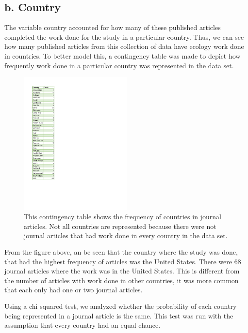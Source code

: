 \documentclass[
]{article}
\begin{document}
\hypertarget{b.-country}{%
\subsection{b. Country}\label{b.-country}}

The variable country accounted for how many of these published articles
completed the work done for the study in a particular country. Thus, we
can see how many published articles from this collection of data have
ecology work done in countries. To better model this, a contingency
table was made to depict how frequently work done in a particular
country was represented in the data set.

\begin{figure}
    \centering
    \includegraphics[width=0.50\textwidth]{country_contingency.pdf}
    \caption{This contingency table shows the frequency of countries in journal articles. Not all countries are represented because there were not journal articles that had work done in every country in the data set.}
    \label{fig:Contingency Table for Country}
\end{figure}

From the figure above, an be seen that the country where the study was
done, that had the highest frequency of articles was the United States.
There were 68 journal articles where the work was in the United States.
This is different from the number of articles with work done in other
countries, it was more common that each only had one or two journal
articles.

Using a chi squared test, we analyzed whether the probability of each
country being represented in a journal article is the same. This test
was run with the assumption that every country had an equal chance.
\end{document}
